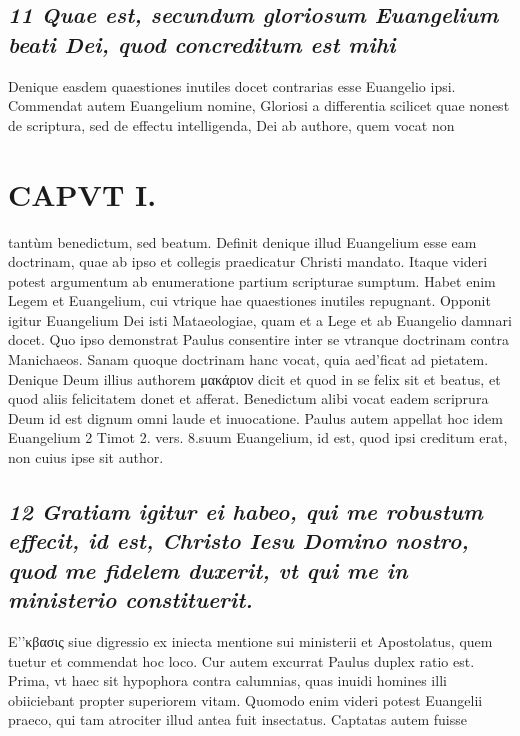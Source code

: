 \documentclass{article}
\begin{document}
\begin{pages}
\subsection*{\textit{11 Quae est, secundum gloriosum Euangelium beati Dei, quod concreditum est mihi }}\pstart Denique easdem quaestiones inutiles docet contrarias esse Euangelio ipsi. Commendat autem Euangelium nomine, Gloriosi a differentia scilicet quae nonest de scriptura, sed de effectu intelligenda, Dei ab authore, quem vocat non  \pend
\section*{CAPVT I. }
\marginpar{[ p.23 ]}\pstart tantùm benedictum, sed beatum. Definit denique illud Euangelium esse eam doctrinam, quae ab ipso et collegis praedicatur Christi mandato. Itaque videri potest argumentum ab enumeratione partium scripturae sumptum. Habet enim Legem et Euangelium, cui vtrique hae quaestiones inutiles repugnant. Opponit igitur Euangelium Dei isti Mataeologiae, quam et a Lege et ab Euangelio damnari docet. Quo ipso demonstrat Paulus consentire inter se vtranque doctrinam contra Manichaeos. Sanam quoque doctrinam hanc vocat, quia aed’ficat ad pietatem. Denique Deum illius authorem μακάριον dicit et quod in se felix sit et beatus, et quod aliis felicitatem donet et afferat. Benedictum alibi vocat eadem scriprura Deum id est dignum omni laude et inuocatione. Paulus autem appellat hoc idem Euangelium 2 Timot 2. vers. 8.suum Euangelium, id est, quod ipsi creditum erat, non cuius ipse sit author.  \pend
{}
{}
\subsection*{\textit{12 Gratiam igitur ei habeo, qui me robustum effecit, id est, Christo Iesu Domino nostro, quod me fidelem duxerit, vt qui me in ministerio constituerit. }}\pstart E’'κβασις siue digressio ex iniecta mentione sui ministerii et Apostolatus, quem tuetur et commendat hoc loco. Cur autem excurrat Paulus duplex ratio est. Prima, vt haec sit hypophora contra calumnias, quas inuidi homines illi obiiciebant propter superiorem vitam. Quomodo enim videri potest Euangelii praeco, qui tam atrociter illud antea fuit insectatus. Captatas autem fuisse  \pend

\end{pages}
\end{document}
